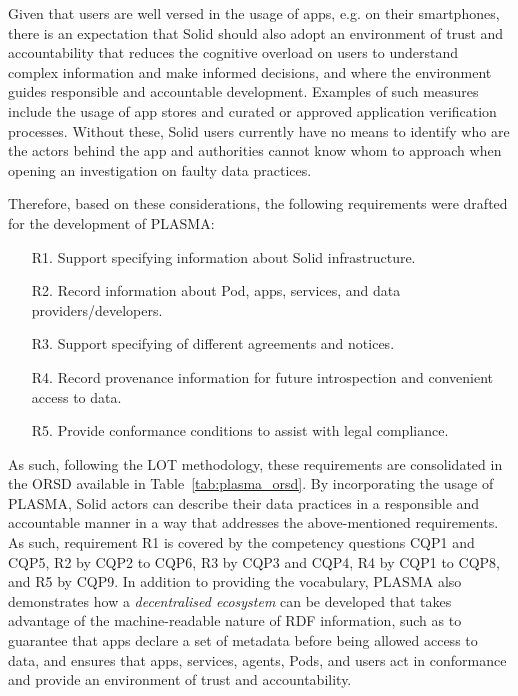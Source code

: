 Given that users are well versed in the usage of apps, e.g. on their smartphones, there is an expectation that Solid should also adopt an environment of trust and accountability that reduces the cognitive overload on users to understand complex information and make informed decisions, and where the environment guides responsible and accountable development.
Examples of such measures include the usage of app stores and curated or approved application verification processes.
Without these, Solid users currently have no means to identify who are the actors behind the app and authorities cannot know whom to approach when opening an investigation on faulty data practices.

Therefore, based on these considerations, the following requirements were drafted for the development of PLASMA:

\begin{enumerate}
    \item [R1.] Support specifying information about Solid infrastructure.
    \item [R2.] Record information about Pod, apps, services, and data providers/developers.
    \item [R3.] Support specifying of different agreements and notices.
    \item [R4.] Record provenance information for future introspection and convenient access to data.
    \item [R5.] Provide conformance conditions to assist with legal compliance.
\end{enumerate}

As such, following the LOT methodology, these requirements are consolidated in the ORSD available in Table~\ref{tab:plasma_orsd}.
By incorporating the usage of PLASMA, Solid actors can describe their data practices in a responsible and accountable manner in a way that addresses the above-mentioned requirements.
As such, requirement R1 is covered by the competency questions CQP1 and CQP5, R2 by CQP2 to CQP6, R3 by CQP3 and CQP4, R4 by CQP1 to CQP8, and R5 by CQP9.
In addition to providing the vocabulary, PLASMA also demonstrates how a \textit{decentralised ecosystem} can be developed that takes advantage of the machine-readable nature of RDF information, such as to guarantee that apps declare a set of metadata before being allowed access to data, and ensures that apps, services, agents, Pods, and users act in conformance and provide an environment of trust and accountability.

